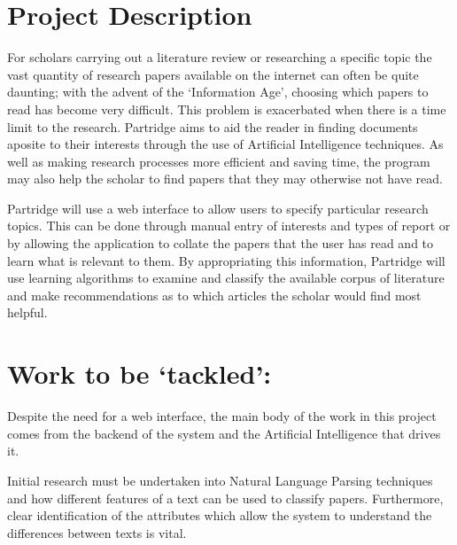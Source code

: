 \documentclass[12pt,a4paper]{article}
\begin{document}



\setlength{\parindent}{0pt}
\setlength{\parskip}{1.5ex plus 0.5ex minus 0.2ex}


\pagebreak

\section{Project Description}

For scholars carrying out a literature review or researching a specific topic
the vast quantity of research papers available on the internet can often be quite daunting;  
with the advent of the `Information Age', choosing which papers to read 
has become very difficult. This problem is exacerbated when there is a 
time limit to the research. Partridge aims to aid the 
reader in finding documents aposite to their interests through the use of 
Artificial Intelligence techniques. As well as making research processes 
more efficient and saving time, the program may also help the scholar to find
papers that they may otherwise not have read.

Partridge will use a web interface to allow users to specify particular
research topics. This can be done through manual entry of interests and types of 
report or by allowing the application to collate the papers that the user 
has read and to learn what is relevant to them. By appropriating this information,
Partridge will use learning algorithms to examine and classify the available
corpus of literature and make recommendations as to which articles the
scholar would find most helpful. 

\section{Work to be `tackled':}
Despite the need for a web interface, the main body of the work in this project 
comes from the backend of the system and the Artificial Intelligence that drives it.

Initial research must be undertaken  into Natural Language
Parsing techniques and how different features of a text can be used to
classify papers. Furthermore, clear identification of the attributes which
allow the system to understand the differences between texts is vital.
\end{document}
